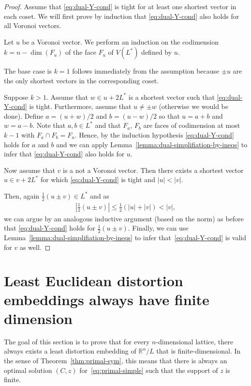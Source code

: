 \documentclass{amsart}
\newcommand{\R}{\mathbb{R}}
\begin{document}
\begin{proof}
Assume that \eqref{eq:dual-Y-cond} is tight for at least one
shortest vector in each coset. We will first prove by
induction that \eqref{eq:dual-Y-cond} also holds for all Voronoi
vectors.

Let $u$ be a Voronoi vector. We perform an induction on the codimension $k = n - \dim(F_u)$ of the face $F_u$ of $V(L^*)$ defined by $u$.

The base case is $k=1$ follows immediately from the assumption because $\pm u$ are the only shortest vectors in the corresponding coset. 

Suppose $k > 1$. Assume that $w \in u + 2L^*$ is a shortest vector such that \eqref{eq:dual-Y-cond} is tight. Furthermore, assume that $u \neq \pm w$ (otherwise we would be done). Define $a = (u+w)/2$ and $b = (u-w)/2$ so that $u = a+b$ and $w = a-b$. Note that $a,b \in L^*$ and that $F_a$, $F_b$ are faces of codimension at most $k-1$ with $F_a \cap F_b = F_u$. Hence, by the induction hypothesis \eqref{eq:dual-Y-cond} holds for $a$ and $b$ and we can apply Lemma~\ref{lemma:dual-simplifiation-by-ineqs} to infer that \eqref{eq:dual-Y-cond} also holds for $u$.

\smallskip

Now assume that $ v $ is a not a Voronoi vector. Then there
exists a shortest vector $ u \in v+2L^* $ for which
\eqref{eq:dual-Y-cond} is tight and $ |u| < |v| $.

Then, again $ \frac{1}{2}(u \pm v) \in L^* $ and as
\begin{align*}
|\frac{1}{2}(u \pm v) | \le \frac{1}{2} (|u| + |v|) < |v|,
\end{align*}
we can argue by an analogous inductive argument (based on the
norm) as before that \eqref{eq:dual-Y-cond} holds for
$ \frac{1}{2}(u \pm v) $.  Finally, we can use
Lemma~\ref{lemma:dual-simplifiation-by-ineqs} to infer that~\eqref{eq:dual-Y-cond} is valid for $ v $ as well.
\end{proof}

%
%
%

\section{Least Euclidean distortion embeddings always have finite
  dimension}
\label{sec:finite-dimensional-embedding}

The goal of this section is to prove that for every $ n $-dimensional
lattice, there always exists a least distortion embedding of
$ \R^n/L $ that is finite-dimensional. In the sense of
Theorem~\ref{thm:primal-sym}, this means that there is always an
optimal solution $ (C,z) $ for~\eqref{eq:primal-simple} such that the
support of $z$ is finite.
\end{document}
